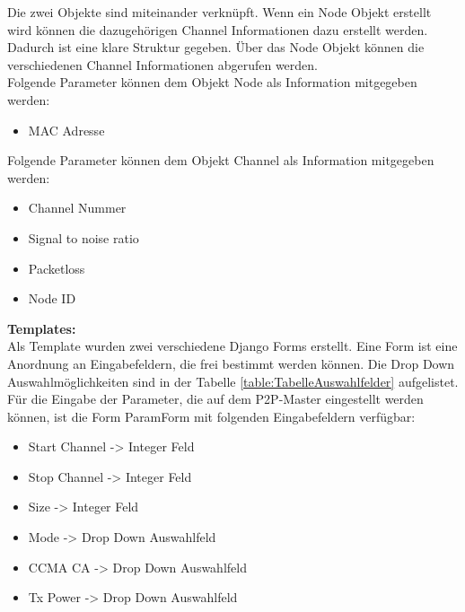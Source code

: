\vspace{3mm}
Die zwei Objekte sind miteinander verknüpft. Wenn ein Node Objekt erstellt wird können die dazugehörigen Channel Informationen dazu erstellt werden. Dadurch ist eine klare Struktur gegeben. Über das Node Objekt können die verschiedenen Channel Informationen abgerufen werden. \\


Folgende Parameter können dem Objekt Node als Information mitgegeben werden:
\begin{itemize}
	\item MAC Adresse
\end{itemize} 

\vspace{3mm}
Folgende Parameter können dem Objekt Channel als Information mitgegeben werden:
\begin{itemize}
	\item Channel Nummer
	\item Signal to noise ratio
	\item Packetloss
	\item Node ID
\end{itemize}

\vspace{5mm}
\textbf{Templates: } \\
Als Template wurden zwei verschiedene Django Forms erstellt. Eine Form ist eine Anordnung an Eingabefeldern, die frei bestimmt werden können. Die Drop Down Auswahlmöglichkeiten sind in der Tabelle \ref{table:TabelleAuswahlfelder} aufgelistet. \\

Für die Eingabe der Parameter, die auf dem P2P-Master eingestellt werden können, ist die Form ParamForm mit folgenden Eingabefeldern verfügbar:
\begin{itemize}
	\item Start Channel \hspace{5mm} -> Integer Feld
	\item Stop Channel \hspace{6mm} -> Integer Feld
	\item Size \hspace{22.3mm} -> Integer Feld
	\item Mode \hspace{19.5mm} -> Drop Down Auswahlfeld
	\item CCMA CA \hspace{10mm} -> Drop Down Auswahlfeld
	\item Tx Power \hspace{13mm} -> Drop Down Auswahlfeld
\end{itemize}

